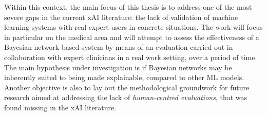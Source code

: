 Within this context, the main focus of this thesis is to address one of the most severe gaps in the current xAI literature: the lack of validation of machine learning systems with real expert users in concrete situations.
The work will focus in particular on the medical area and will attempt to assess the effectiveness of a Bayesian network-based system by means of an evaluation carried out in collaboration with expert clinicians in a real work setting, over a period of time.
The main hypothesis under investigation is if Bayesian networks may be inherently suited to being made explainable, compared to other ML models. 
Another objective is also to lay out the methodological groundwork for future research aimed at addressing the lack of \textit{human-centred evaluations}, that was found missing in the xAI literature.